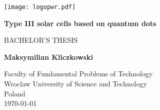 \begin{titlepage}
   \begin{center}
       \vspace*{1cm}
       
	   \texttt{[image: logopwr.pdf]}
	   
	   \vspace*{5cm}
	   
       \textbf{\Huge Type III solar cells based on quantum dots}
       
       \vspace{1.5cm}
       
 	   \Large BACHELOR'S THESIS
 	   
       \vfill
       
	   \textbf{Maksymilian Kliczkowski}
       \vspace{0.8cm}
 
       
 
       \small Faculty of Fundamental Problems of Technology\\
       Wroclaw University of Science and Technology\\
       Poland\\
       \today
 
   \end{center}
\end{titlepage}